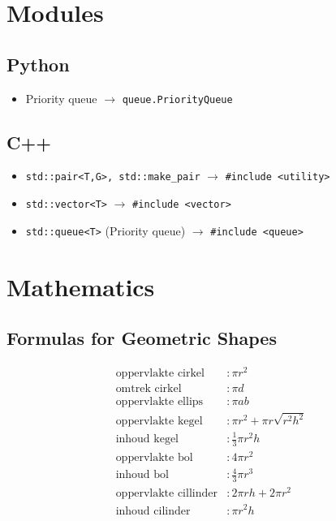 \documentclass[a4paper, twocolumn]{article}
\newcommand{\arrow}{$\rightarrow$ }
\newcommand{\ms}{\texttt}
\begin{document}
\section{Modules}
\subsection{Python}
\begin{itemize}
	\item Priority queue \arrow \ms{queue.PriorityQueue}
\end{itemize}
\subsection{C++}
\begin{itemize}
	\item \ms{std::pair<T,G>, std::make\_pair} \arrow \ms{\#include <utility>}
	\item \ms{std::vector<T>} \arrow \ms{\#include <vector>}
	\item \ms{std::queue<T>} (Priority queue) \arrow \ms{\#include <queue>}
\end{itemize}

\section{Mathematics}
\subsection*{Formulas for Geometric Shapes}
\vspace{-1em}
\begin{align*}
\text{oppervlakte cirkel}   &: \pi r^2 \\
\text{omtrek cirkel}        &: \pi d \\
\text{oppervlakte ellips}   &: \pi a b \\
\text{oppervlakte kegel}    &: \pi r^2 + \pi r \sqrt{r^2 h^2} \\
\text{inhoud kegel}         &: \frac{1}{3}\pi r^2 h \\
\text{oppervlakte bol}      &: 4 \pi r^2 \\
\text{inhoud bol}           &: \frac{4}{3} \pi r^3 \\
\text{oppervlakte cillinder}&: 2\pi rh + 2\pi r^2 \\
\text{inhoud cilinder}      &: \pi r^2 h 
\end{align*}    
\vspace{-2em}
\end{document}
